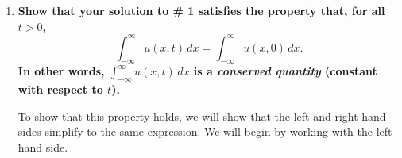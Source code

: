 \documentclass[11pt]{article}
\newenvironment{solution}
  {\renewcommand\qedsymbol{$\blacksquare$}\begin{proof}[Solution]}
  {\end{proof}}
\begin{document}
\begin{enumerate}
\begin{solution}
Factoring out a $e^{-\frac{x^2 \cdot \frac{t}{t+1}}{4t}} = e^{-\frac{x^2}{4(t+1)}}$ term from the integrand, we get that
\[ u(x, t) = \frac{1}{\sqrt{4\pi t}} e^{-\frac{x^2}{4(t+1)}}\int_{-\infty}^{\infty} e^{-\frac{(t+1)\left(y-\frac{x}{t+1}\right)^2}{4t}}\, dy \]

We will now make a substitution to transform the integrand into $e^{-r^2}$: let \[r = \frac{\left(y-\frac{x}{t+1}\right)\sqrt{t+1}}{\sqrt{4t}}.\]
Then we also have that \[ dr = \frac{\sqrt{t+1}}{\sqrt{4t}} \, dy. \]

Making the substitution for $r$ in our solution $u(x, t)$, we find that 
\begin{align*} u(x, t) &= \frac{1}{\sqrt{4\pi t}} e^{-\frac{x^2}{4(t+1)}}\int_{y = -\infty}^{y = \infty} e^{-\frac{(t+1)\left(y-\frac{x}{t+1}\right)^2}{4t}}\, dy \\
&= \frac{1}{\sqrt{\pi(t+1)}} e^{-\frac{x^2}{4(t+1)}} \int_{r = -\infty}^{r = \infty} e^{-r^2} \, dr. \end{align*}

But we also know that $\int_{-\infty}^{\infty} e^{-r^2} \, dr = \sqrt{\pi}$, so plugging this back into our solution, we find that
\begin{align*} u(x, t) &= \frac{1}{\sqrt{\pi(t+1)}} e^{-\frac{x^2}{4(t+1)}} \int_{r = -\infty}^{r = \infty} e^{-r^2} \, dr \\
&= \left(\frac{1}{\sqrt{\pi(t+1)}} e^{-\frac{x^2}{4(t+1)}}\right) \cdot \sqrt{\pi} \\
&= \frac{1}{\sqrt{t+1}} e^{-\frac{x^2}{4(t+1)}}. \end{align*}

Thus, our solution to the given diffusion PDE with the given initial value is
\[ \boxed{u(x, t) = \frac{1}{\sqrt{t+1}} e^{-\frac{x^2}{4(t+1)}}.}\]
	

\end{solution}

\newpage

\item \textbf{Show that your solution to \# 1 satisfies the property that, for all $t > 0$,}
\[ \int_{-\infty}^{\infty} u(x, t) \, dx = \int_{-\infty}^{\infty} u(x, 0) \, dx.  \]
\textbf{In other words, $\int_{-\infty}^{\infty} u(x, t) \, dx$ is a \textit{conserved quantity} (constant with respect to $t$). }

To show that this property holds, we will show that the left and right hand sides simplify to the same expression. We will begin by working with the left-hand side. \\


\end{enumerate}
\end{document}

